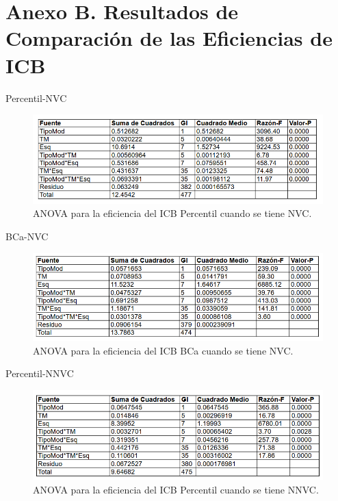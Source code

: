\newpage
\section*{Anexo B. Resultados de Comparación de las Eficiencias de ICB}

Percentil-NVC

\begin{figure}[ht] 
	\centering 
	\includegraphics[width=0.95\linewidth]{img/ANOVA_Efic_ICB_Perc_NVC.png} 
	\caption{ANOVA para la eficiencia del ICB Percentil cuando se tiene NVC.} 
	\label{fig:ANOVA_Efic_ICB_Perc_NVC}
\end{figure}
\FloatBarrier



BCa-NVC

\begin{figure}[ht] 
	\centering 
	\includegraphics[width=0.95\linewidth]{img/ANOVA_Efic_ICB_BCa_NVC.png} 
	\caption{ANOVA para la eficiencia del ICB BCa cuando se tiene NVC.} 
	\label{fig:ANOVA_Efic_ICB_BCa_NVC}
\end{figure}
\FloatBarrier




Percentil-NNVC

\begin{figure}[ht] 
	\centering 
	\includegraphics[width=0.95\linewidth]{img/ANOVA_Efic_ICB_Perc_NNVC.png} 
	\caption{ANOVA para la eficiencia del ICB Percentil cuando se tiene NNVC.} 
	\label{fig:ANOVA_Efic_ICB_Perc_NNVC}
\end{figure}
\FloatBarrier




